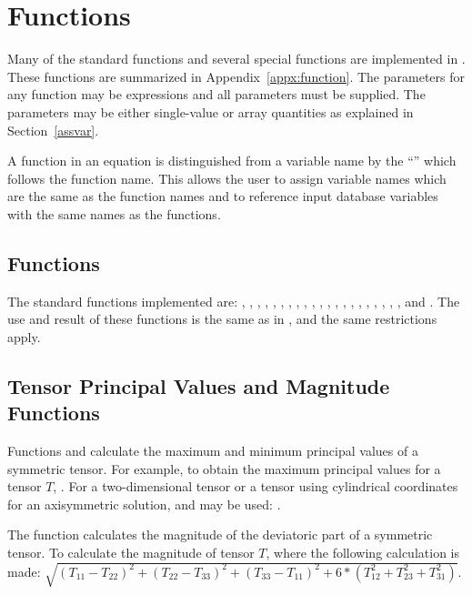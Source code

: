 \section{Functions}

Many of the standard  functions and several special
functions are implemented in \caps{\PROGRAM}. 
These functions are summarized in Appendix~\ref{appx:function}.
The parameters for any
function may be expressions and all parameters must be supplied. The
parameters may be either single-value or array quantities as explained
in Section~\ref{assvar}.

A function in an equation is distinguished from a variable name by the
``\cmd{(}'' which follows the function name. This allows the user to
assign variable names which are the same as the function names and to
reference input database variables with the same names as the functions.

\subsection*{ Functions}

The standard  functions implemented are: ,
, , , , , ,
, , , , , ,
, , , , , ,
, , and . The use and result of these
functions is the same as in , and the same restrictions
apply.

\subsection*{Tensor Principal Values and Magnitude Functions}

Functions  and  calculate the maximum and minimum
principal values of a symmetric tensor. For example, to obtain the
maximum principal values for a tensor $T$,
\cenlinesbegin
{}.
\cenlinesend
For a two-dimensional tensor or a tensor using cylindrical coordinates
for an axisymmetric solution,  and  may be used:
\cenlinesbegin
{}.
\cenlinesend

The function  calculates the magnitude of the deviatoric part
of a symmetric tensor. To calculate the magnitude of tensor $T$,
\cenlinesbegin
{}
\cenlinesend
where the following calculation is made:
\cenlinesbegin
{}$\sqrt{(T_{11} - T_{22})^{2} + (T_{22} - T_{33})^{2} +
(T_{33} - T_{11})^{2} + 6 * (T_{12}^{2} + T_{23}^{2} + T_{31}^{2})}$.
\cenlinesend

